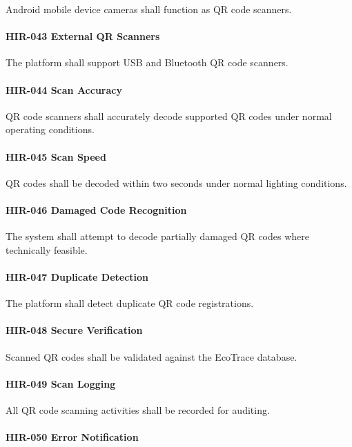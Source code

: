 Android mobile device cameras shall function as QR code scanners.

\paragraph{HIR-043 External QR Scanners}

The platform shall support USB and Bluetooth QR code scanners.

\paragraph{HIR-044 Scan Accuracy}

QR code scanners shall accurately decode supported QR codes under
normal operating conditions.

\paragraph{HIR-045 Scan Speed}

QR codes shall be decoded within two seconds under normal lighting
conditions.

\paragraph{HIR-046 Damaged Code Recognition}

The system shall attempt to decode partially damaged QR codes where
technically feasible.

\paragraph{HIR-047 Duplicate Detection}

The platform shall detect duplicate QR code registrations.

\paragraph{HIR-048 Secure Verification}

Scanned QR codes shall be validated against the EcoTrace database.

\paragraph{HIR-049 Scan Logging}

All QR code scanning activities shall be recorded for auditing.

\paragraph{HIR-050 Error Notification}


